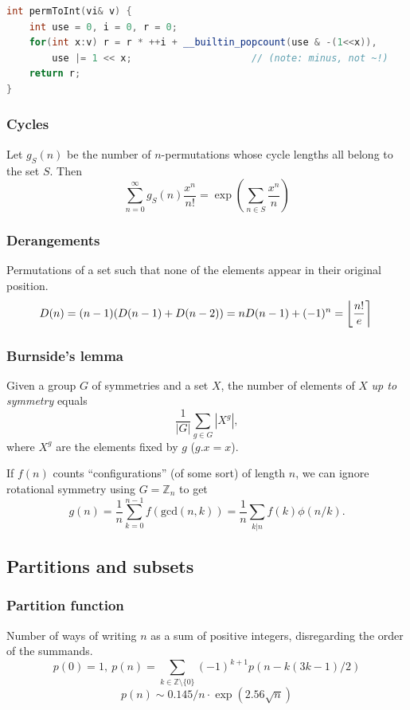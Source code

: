 \begin{multicols}{\Columns}
\begin{lstlisting}[language=C++]
int permToInt(vi& v) {
	int use = 0, i = 0, r = 0;
	for(int x:v) r = r * ++i + __builtin_popcount(use & -(1<<x)),
		use |= 1 << x;                     // (note: minus, not ~!)
	return r;
}
\end{lstlisting}


	\subsubsection{Cycles}
		Let $g_S(n)$ be the number of $n$-permutations whose cycle lengths all belong to the set $S$. Then
		$$\sum_{n=0} ^\infty g_S(n) \frac{x^n}{n!} = \exp\left(\sum_{n\in S} \frac{x^n} {n} \right)$$

	\subsubsection{Derangements}
		Permutations of a set such that none of the elements appear in their original position.
		\[ \mkern-2mu D(n) = (n-1)(D(n-1)+D(n-2)) = n D(n-1)+(-1)^n = \left\lfloor\frac{n!}{e}\right\rceil \]

	\subsubsection{Burnside's lemma}
		Given a group $G$ of symmetries and a set $X$, the number of elements of $X$ \emph{up to symmetry} equals
		 \[ {\frac {1}{|G|}}\sum _{{g\in G}}|X^{g}|, \]
		 where $X^{g}$ are the elements fixed by $g$ ($g.x = x$).

		 If $f(n)$ counts ``configurations'' (of some sort) of length $n$, we can ignore rotational symmetry using $G = \mathbb Z_n$ to get
		 \[ g(n) = \frac 1 n \sum_{k=0}^{n-1}{f(\text{gcd}(n, k))} = \frac 1 n \sum_{k|n}{f(k)\phi(n/k)}. \]

\subsection{Partitions and subsets}
	\subsubsection{Partition function}
		Number of ways of writing $n$ as a sum of positive integers, disregarding the order of the summands.
		\[ p(0) = 1,\ p(n) = \sum_{k \in \mathbb Z \setminus \{0\}}{(-1)^{k+1} p(n - k(3k-1) / 2)} \]
		\[ p(n) \sim 0.145 / n \cdot \exp(2.56 \sqrt{n}) \]


\end{multicols}
